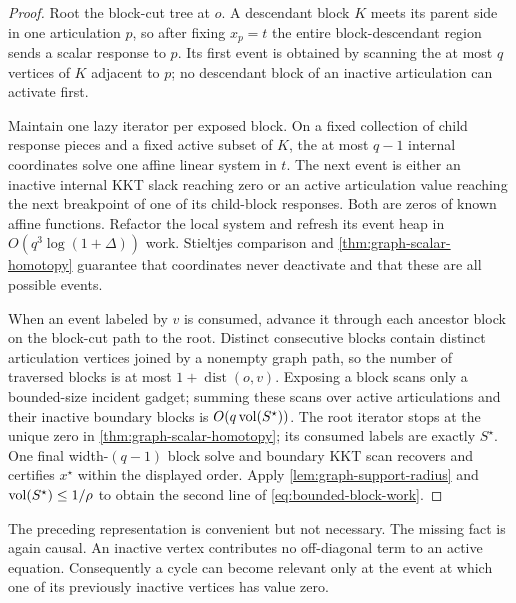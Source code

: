 \begin{proof}
Root the block-cut tree at $o$.  A descendant block $K$ meets its parent side
in one articulation $p$, so after fixing $x_p=t$ the entire block-descendant
region sends a scalar response to $p$.  Its first event is obtained by scanning
the at most $q$ vertices of $K$ adjacent to $p$; no descendant block of an
inactive articulation can activate first.

Maintain one lazy iterator per exposed block.  On a fixed collection of child
response pieces and a fixed active subset of $K$, the at most $q-1$ internal
coordinates solve one affine linear system in $t$.  The next event is either
an inactive internal KKT slack reaching zero or an active articulation value
reaching the next breakpoint of one of its child-block responses.  Both are
zeros of known affine functions.  Refactor the local system and refresh its
event heap in $O(q^3\log(1+\Delta))$ work.  Stieltjes comparison and
\cref{thm:graph-scalar-homotopy} guarantee that coordinates never deactivate
and that these are all possible events.

When an event labeled by $v$ is consumed, advance it through each ancestor
block on the block-cut path to the root.  Distinct consecutive blocks contain
distinct articulation vertices joined by a nonempty graph path, so the number
of traversed blocks is at most $1+\operatorname{dist}(o,v)$.  Exposing a block
scans only a bounded-size incident gadget; summing these scans over active
articulations and their inactive boundary blocks is
$O(q\operatorname{vol}(S^\star))$.  The root iterator stops at the unique zero in
\cref{thm:graph-scalar-homotopy}; its consumed labels are exactly
$S^\star$.  One final width-$(q-1)$ block solve and boundary KKT scan recovers
and certifies $x^\star$ within the displayed order.  Apply
\cref{lem:graph-support-radius} and
$\operatorname{vol}(S^\star)\leq1/\rho$ to obtain the second line of
\cref{eq:bounded-block-work}.
\end{proof}

The preceding representation is convenient but not necessary.  The missing
fact is again causal.  An inactive vertex contributes no off-diagonal term to
an active equation.  Consequently a cycle can become relevant only at the
event at which one of its previously inactive vertices has value zero.

